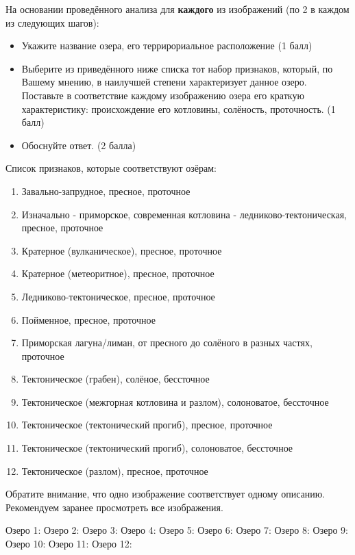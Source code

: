 
На основании проведённого анализа для \textbf{каждого} из изображений (по 2 в каждом из следующих шагов):
\begin{itemize}
    \item Укажите название озера, его террирориальное расположение (1 балл)
    \item Выберите из приведённого ниже списка тот набор признаков, который, по Вашему мнению, в наилучшей степени характеризует данное озеро. Поставьте в соответствие каждому изображению озера его краткую характеристику: происхождение его котловины, солёность, проточность. (1 балл)
    \item Обоснуйте ответ. (2 балла)
\end{itemize}

Список признаков, которые соответствуют озёрам:
\begin{enumerate}
    \item Завально-запрудное, пресное, проточное
    \item Изначально - приморское, современная котловина - ледниково-тектоническая, пресное, проточное
    \item Кратерное (вулканическое), пресное, проточное
    \item Кратерное (метеоритное), пресное, проточное
    \item Ледниково-тектоническое, пресное, проточное
    \item Пойменное, пресное, проточное
    \item Приморская лагуна/лиман, от пресного до солёного в разных частях, проточное
    \item Тектоническое (грабен), солёное, бессточное
    \item Тектоническое (межгорная котловина и разлом), солоноватое, бессточное
    \item Тектоническое (тектонический прогиб), пресное, проточное
    \item Тектоническое (тектонический прогиб), солоноватое, бессточное
    \item Тектоническое (разлом), пресное, проточное
\end{enumerate}

Обратите внимание, что одно изображение соответствует одному описанию. Рекомендуем заранее просмотреть все изображения.

Озеро 1:
Озеро 2:
Озеро 3:
Озеро 4:
\newpage
Озеро 5:
Озеро 6:
Озеро 7:
\newpage
Озеро 8:
Озеро 9:
Озеро 10:
\newpage
Озеро 11:
Озеро 12:

